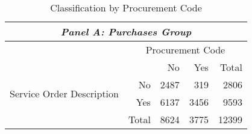 \begin{table}[!hbtp]
  \caption{\label{tab:textbycode}Classification by Procurement Code}
  \centering
  \footnotesize
  \begin{tabular}{crrrr}
    \hline

    \hline
    \multicolumn{5}{c}{\emph{Panel A: Purchases Group}} \T \B \\
    \hline
    & \multicolumn{4}{c}{\parbox{.25\textwidth}{\centering Procurement Code}} \T \B \\
    \multicolumn{1}{c}{\multirow{4}{*}{\parbox[c][][c]{.15\textwidth}{\centering Service Order Description}}} & \multicolumn{1}{l}{} & No & Yes & Total \T \B \\
                         \cline{2-5}
    \multicolumn{1}{c}{} & No        & 2487      & 319      & 2806  \T \B \\
    \multicolumn{1}{c}{} & Yes       & 6137      & 3456     & 9593  \T \B \\
                         \cline{2-5}
    \multicolumn{1}{c}{} & Total     & 8624      & 3775     & 12399 \T \B \\
    \hline

    \hline
  \end{tabular}
\end{table}